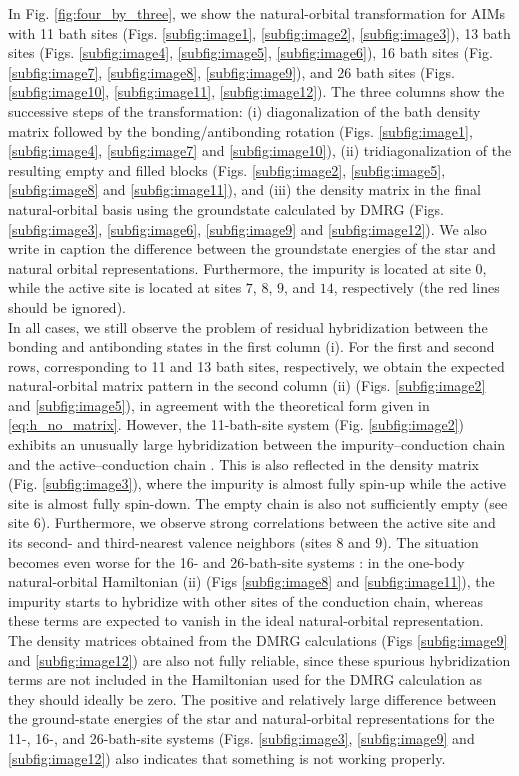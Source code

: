 \documentclass[11pt]{article}
\begin{document}
In Fig. \ref{fig:four_by_three}, we show the natural-orbital transformation for AIMs with 11 bath sites (Figs. \ref{subfig:image1}, \ref{subfig:image2}, \ref{subfig:image3}), 13 bath sites (Figs. \ref{subfig:image4}, \ref{subfig:image5}, \ref{subfig:image6}), 16 bath sites (Fig. \ref{subfig:image7}, \ref{subfig:image8}, \ref{subfig:image9}), and 26 bath sites (Figs. \ref{subfig:image10}, \ref{subfig:image11}, \ref{subfig:image12}). The three columns show the successive steps of the transformation: (i) diagonalization of the bath density matrix followed by the bonding/antibonding rotation (Figs. \ref{subfig:image1}, \ref{subfig:image4}, \ref{subfig:image7} and \ref{subfig:image10}), (ii) tridiagonalization of the resulting empty and filled blocks (Figs. \ref{subfig:image2}, \ref{subfig:image5}, \ref{subfig:image8} and \ref{subfig:image11}), and (iii) the density matrix in the final natural-orbital basis using the groundstate calculated by DMRG (Figs. \ref{subfig:image3}, \ref{subfig:image6}, \ref{subfig:image9} and \ref{subfig:image12}). We also write in caption the difference between the groundstate energies of the star and natural orbital representations. Furthermore, the impurity is located at site $0$, while the active site is located at sites $7$, $8$, $9$, and $14$, respectively (the red lines should be ignored).\\
In all cases, we still observe the problem of residual hybridization between the bonding and antibonding states in the first column (i). For the first and second rows, corresponding to 11 and 13 bath sites, respectively, we obtain the expected natural-orbital matrix pattern in the second column (ii) (Figs. \ref{subfig:image2} and \ref{subfig:image5}), in agreement with the theoretical form given in \eqref{eq:h_no_matrix}. However, the 11-bath-site system (Fig. \ref{subfig:image2}) exhibits an unusually large hybridization between the impurity--conduction chain and the active--conduction chain . This is also reflected in the density matrix (Fig. \eqref{subfig:image3}), where the impurity is almost fully spin-up while the active site is almost fully spin-down. The empty chain is also not sufficiently empty (see site 6). Furthermore, we observe strong correlations between the active site and its second- and third-nearest valence neighbors (sites 8 and 9). The situation becomes even worse for the 16- and 26-bath-site systems : in the one-body natural-orbital Hamiltonian (ii) (Figs \ref{subfig:image8} and \ref{subfig:image11}), the impurity starts to hybridize with other sites of the conduction chain, whereas these terms are expected to vanish in the ideal natural-orbital representation. The density matrices obtained from the DMRG calculations (Figs \ref{subfig:image9} and \ref{subfig:image12}) are also not fully reliable, since these spurious hybridization terms are not included in the Hamiltonian used for the DMRG calculation as they should ideally be zero. The positive and relatively large difference between the ground-state energies of the star and natural-orbital representations for the 11-, 16-, and 26-bath-site systems (Figs. \ref{subfig:image3}, \ref{subfig:image9} and \ref{subfig:image12}) also indicates that something is not working properly.\\
\end{document}
